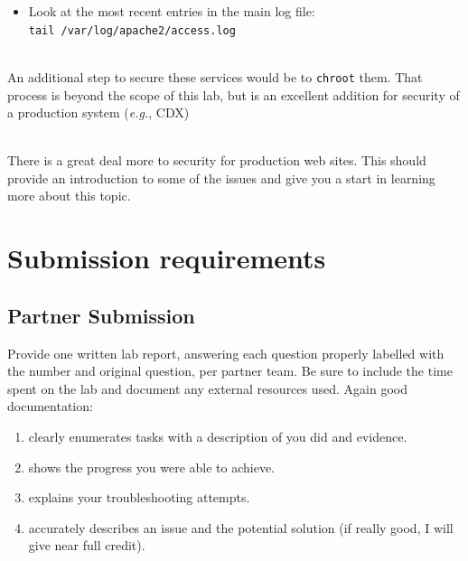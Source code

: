 \documentclass{article}
\begin{document}
\begin{itemize}
    \item Look at the most recent entries in the main log file: \\
    {\tt tail  /var/log/apache2/access.log}

\end{itemize}

 \\
\noindent
An additional step to secure these services would be to {\tt chroot} them. That process is beyond the scope of this lab, but is an excellent addition for security of a production system (\emph{e.g.}, CDX)

 \\

\noindent
There is a great deal more to security for production web sites. This should provide an introduction to some of the issues and give you a start in learning more about this topic.

\section{Submission requirements}

\subsection{Partner Submission}

Provide one written lab report, answering each question properly labelled with the number and original question, per partner team. Be sure to include the time spent on the lab and document any external resources used. 
Again good documentation: 
\begin{enumerate}
\item clearly enumerates tasks with a description of you did and evidence.  
\item shows the progress you were able to achieve.
\item explains your troubleshooting attempts.
\item accurately describes an issue and the potential solution (if really good, I will give near full credit).
\end{enumerate}
\end{document}
